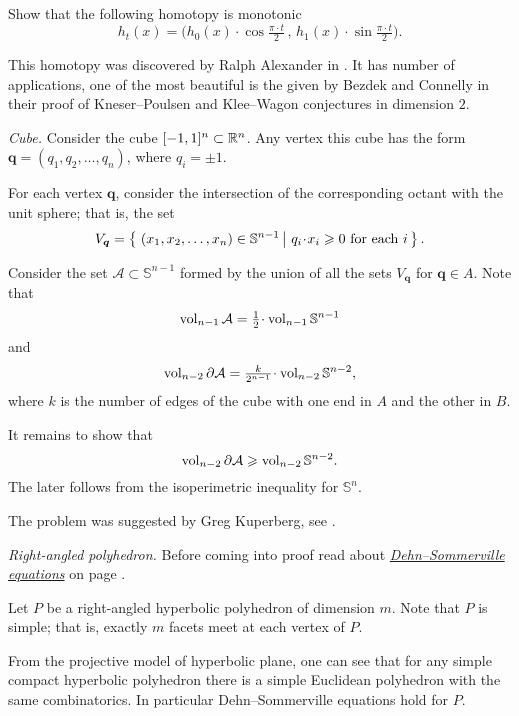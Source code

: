 Show that the following homotopy is monotonic
\[h_t(x)=\bigl(h_0(x)\cdot \cos\tfrac{\pi\cdot t}2
\,,\,
 h_1(x)\cdot\sin\tfrac{\pi\cdot t}{2}\bigr).\] 


This homotopy was discovered by Ralph Alexander in \cite{ralexander}.
It has number of applications, 
one of the most beautiful is the given by Bezdek and Connelly \cite{bezdek-connelly} in their proof of Kneser--Poulsen  and Klee--Wagon conjectures in dimension $2$.



\textit{Cube.}
Consider the cube $[-1,1]^n\subset \mathbb{R}^n$.
Any vertex this cube has the form $\bm{q}=(q_1,q_2,\dots,q_n)$,
where  $q_i=\pm1$.

For each vertex $\bm{q}$,
consider the intersection of the corresponding octant with the unit sphere;
that is, the set
\[V_{\bm{q}}=\set{(x_1,x_2,\dots,x_n)\in\mathbb{S}^{n-1}}{q_i\cdot x_i\ge 0\ \text{for each}\ i}.\]

Consider the set $\mathcal{A}\subset\mathbb{S}^{n-1}$
formed by the union of all the sets $V_{\bm{q}}$ for $\bm{q}\in A$.
Note that 
\[\vol_{n-1}\mathcal{A}=\tfrac12\cdot\vol_{n-1}\mathbb{S}^{n-1}\]
and 
\[\vol_{n-2}\partial\mathcal{A}
=
\tfrac k{2^{n-1}}\cdot\vol_{n-2}\mathbb{S}^{n-2},\]
where $k$ is the number of edges of the cube with one end in $A$ and the other in $B$.

It remains to  show that 
\[\operatorname{\rm vol}_{n-2}\partial\mathcal{A}
\geqslant \operatorname{\rm vol}_{n-2}\mathbb{S}^{n-2}.\]
The later follows from the isoperimetric inequality for $\mathbb{S}^n$. 

The problem was suggested by Greg Kuperberg, 
see \cite{One-step problems in geometry}.



\textit{Right-angled polyhedron.}
Before coming into proof read 
about \hyperref[Dehn--Sommerville equations]{\emph{Dehn--Sommerville equations}}
on page \pageref{Dehn--Sommerville equations}.

Let $P$ be a right-angled hyperbolic polyhedron of dimension $m$.
Note that $P$ is simple; that is, exactly $m$ facets meet at each vertex of $P$.

From the projective model of hyperbolic plane, 
one can see that for any simple compact hyperbolic polyhedron there is a simple Euclidean polyhedron with the same combinatorics. 
In particular Dehn--Sommerville equations hold for $P$.

